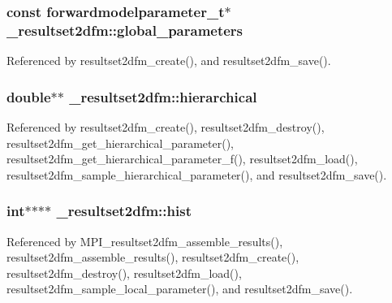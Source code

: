 \subsubsection[{\texorpdfstring{global\+\_\+parameters}{global_parameters}}]{\setlength{\rightskip}{0pt plus 5cm}const {\bf forwardmodelparameter\+\_\+t}$\ast$ \+\_\+resultset2dfm\+::global\+\_\+parameters}\hypertarget{struct__resultset2dfm_ae393bd44ecda076e9a96f193df78e7fd}{}\label{struct__resultset2dfm_ae393bd44ecda076e9a96f193df78e7fd}


Referenced by resultset2dfm\+\_\+create(), and resultset2dfm\+\_\+save().

\subsubsection[{\texorpdfstring{hierarchical}{hierarchical}}]{\setlength{\rightskip}{0pt plus 5cm}double$\ast$$\ast$ \+\_\+resultset2dfm\+::hierarchical}\hypertarget{struct__resultset2dfm_a46617b8c3c957540fee87fe0bcf0dcd6}{}\label{struct__resultset2dfm_a46617b8c3c957540fee87fe0bcf0dcd6}


Referenced by resultset2dfm\+\_\+create(), resultset2dfm\+\_\+destroy(), resultset2dfm\+\_\+get\+\_\+hierarchical\+\_\+parameter(), resultset2dfm\+\_\+get\+\_\+hierarchical\+\_\+parameter\+\_\+f(), resultset2dfm\+\_\+load(), resultset2dfm\+\_\+sample\+\_\+hierarchical\+\_\+parameter(), and resultset2dfm\+\_\+save().

\subsubsection[{\texorpdfstring{hist}{hist}}]{\setlength{\rightskip}{0pt plus 5cm}int$\ast$$\ast$$\ast$$\ast$ \+\_\+resultset2dfm\+::hist}\hypertarget{struct__resultset2dfm_a0a4ebd9da7a78fd2ecd538da79997bf6}{}\label{struct__resultset2dfm_a0a4ebd9da7a78fd2ecd538da79997bf6}


Referenced by M\+P\+I\+\_\+resultset2dfm\+\_\+assemble\+\_\+results(), resultset2dfm\+\_\+assemble\+\_\+results(), resultset2dfm\+\_\+create(), resultset2dfm\+\_\+destroy(), resultset2dfm\+\_\+load(), resultset2dfm\+\_\+sample\+\_\+local\+\_\+parameter(), and resultset2dfm\+\_\+save().


